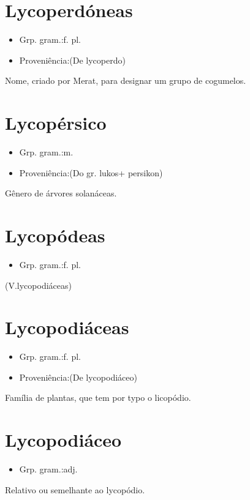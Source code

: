 \section{Lycoperdóneas}
\begin{itemize}
\item {Grp. gram.:f. pl.}
\end{itemize}
\begin{itemize}
\item {Proveniência:(De \textunderscore lycoperdo\textunderscore )}
\end{itemize}
Nome, criado por Merat, para designar um grupo de cogumelos.
\section{Lycopérsico}
\begin{itemize}
\item {Grp. gram.:m.}
\end{itemize}
\begin{itemize}
\item {Proveniência:(Do gr. \textunderscore lukos\textunderscore  + \textunderscore persikon\textunderscore )}
\end{itemize}
Gênero de árvores solanáceas.
\section{Lycopódeas}
\begin{itemize}
\item {Grp. gram.:f. pl.}
\end{itemize}
(V.lycopodiáceas)
\section{Lycopodiáceas}
\begin{itemize}
\item {Grp. gram.:f. pl.}
\end{itemize}
\begin{itemize}
\item {Proveniência:(De \textunderscore lycopodiáceo\textunderscore )}
\end{itemize}
Família de plantas, que tem por typo o licopódio.
\section{Lycopodiáceo}
\begin{itemize}
\item {Grp. gram.:adj.}
\end{itemize}
Relativo ou semelhante ao lycopódio.
